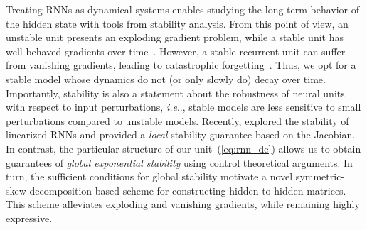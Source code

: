 \documentclass{article} \usepackage{iclr2021_conference,times}
\makeatletter
\DeclareRobustCommand\onedot{\futurelet\@let@token\@onedot}
\def\@onedot{\ifx\@let@token.\else.\null\fi\xspace}
\def\ie{\emph{i.e}\onedot} \def\Ie{\emph{I.e}\onedot}
\makeatother
\begin{document}
Treating RNNs as dynamical systems enables studying the long-term behavior of the hidden state with tools from stability analysis. From this point of view, an unstable unit presents an exploding gradient problem, while a stable unit has well-behaved gradients over time~\citep{miller2018stable}. However, a stable recurrent unit can suffer from vanishing gradients, leading to catastrophic forgetting~\citep{hochreiter1997long}. Thus, we opt for a stable model whose dynamics do not (or only slowly do) decay over time. Importantly, stability is also a statement about the robustness of neural units with respect to input perturbations, \ie, stable models are less sensitive to small perturbations compared to unstable models. Recently, \citet{chang2018antisymmetricrnn} explored the stability of linearized RNNs and provided a {\em local} stability guarantee based on the Jacobian. In contrast, the particular structure of our unit~(\ref{eq:rnn_de}) allows us to obtain guarantees of {\em global exponential stability} using control theoretical arguments.
In turn, the sufficient conditions for global stability motivate a novel symmetric-skew decomposition based scheme for constructing hidden-to-hidden matrices.
This scheme alleviates exploding and vanishing gradients, while remaining highly expressive. 
\end{document}
